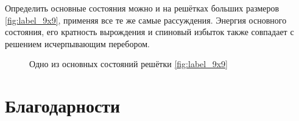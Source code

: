 \documentclass[utf8, babel, sor, jor, amsmath,amssymb, reprint]{elsarticle} %
\begin{document}
Определить основные состояния можно и на решётках больших размеров \ref{fig:label_9x9}, применяя все те же самые рассуждения. Энергия основного состояния, его кратность вырождения и спиновый избыток также совпадает с решением исчерпывающим перебором.

\begin{figure}[h]
	\centering
	\caption{Одно из основных состояний решётки \eqref{fig:label_9x9}}
	\label{fig:label_9x9_gs_1}
\end{figure}




\section{Благодарности}

 


\end{document}

